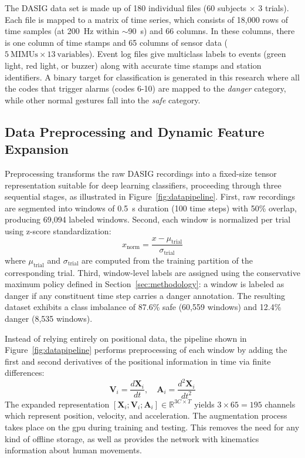\documentclass[DTMColor]{ROB-New}
\begin{document}
The DASIG data set is made up of 180 individual files (60 subjects $\times$ 3 trials). Each file is mapped to a matrix of time series, which consists of 18,000 rows of time samples (at 200~Hz within $\sim$90~s) and 66 columns. In these columns, there is one column of time stamps and 65 columns of sensor data ($5~\text{MIMUs} \times 13~\text{variables}$). Event log files give multiclass labels to events (green light, red light, or buzzer) along with accurate time stamps and station identifiers. A binary target for classification is generated in this research where all the codes that trigger alarms (codes 6-10) are mapped to the \textit{danger} category, while other normal gestures fall into the \textit{safe} category.

\subsection{Data Preprocessing and Dynamic Feature Expansion}

Preprocessing transforms the raw DASIG recordings into a fixed-size tensor representation suitable for deep learning classifiers, proceeding through three sequential stages, as illustrated in Figure~\ref{fig:datapipeline}. First, raw recordings are segmented into windows of 0.5~s duration (100 time steps) with 50\% overlap, producing 69,094 labeled windows. Second, each window is normalized per trial using z-score standardization:
\begin{equation}
    x_{\text{norm}} = \frac{x - \mu_{\text{trial}}}{\sigma_{\text{trial}}}
\end{equation}
where $\mu_{\text{trial}}$ and $\sigma_{\text{trial}}$ are computed from the training partition of the corresponding trial. Third, window-level labels are assigned using the conservative maximum policy defined in Section~\ref{sec:methodology}: a window is labeled as danger if any constituent time step carries a danger annotation. The resulting dataset exhibits a class imbalance of 87.6\% safe (60,559 windows) and 12.4\% danger (8,535 windows).

Instead of relying entirely on positional data, the pipeline shown in Figure~\ref{fig:datapipeline} performs preprocessing of each window by adding the first and second derivatives of the positional information in time via finite differences:
\begin{equation}
    \mathbf{V}_i = \frac{d\mathbf{X}_i}{dt}, \quad \mathbf{A}_i = \frac{d^2\mathbf{X}_i}{dt^2}
\end{equation}
The expanded representation $[\mathbf{X}_i; \mathbf{V}_i; \mathbf{A}_i] \in \mathbb{R}^{3C \times T}$ yields $3 \times 65 = 195$ channels which represent position, velocity, and acceleration. The augmentation process takes place on the \ac{gpu} during training and testing. This removes the need for any kind of offline storage, as well as provides the network with kinematics information about human movements.
\end{document}
